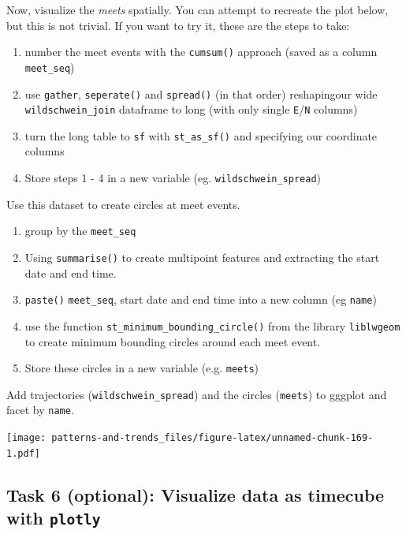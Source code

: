 \documentclass[]{book}
\providecommand{\tightlist}{%
  \setlength{\itemsep}{0pt}\setlength{\parskip}{0pt}}
\begin{document}
Now, visualize the \emph{meets} spatially. You can attempt to recreate
the plot below, but this is not trivial. If you want to try it, these
are the steps to take:

\begin{enumerate}
\def\labelenumi{\arabic{enumi}.}
\tightlist
\item
  number the meet events with the \texttt{cumsum()} approach (saved as a
  column \texttt{meet\_seq})
\item
  use \texttt{gather}, \texttt{seperate()} and \texttt{spread()} (in
  that order) reshapingour wide \texttt{wildschwein\_join} dataframe to
  long (with only single \texttt{E}/\texttt{N} columns)
\item
  turn the long table to \texttt{sf} with \texttt{st\_as\_sf()} and
  specifying our coordinate columns
\item
  Store steps 1 - 4 in a new variable (eg. \texttt{wildschwein\_spread})
\end{enumerate}

Use this dataset to create circles at meet events.

\begin{enumerate}
\def\labelenumi{\arabic{enumi}.}
\tightlist
\item
  group by the \texttt{meet\_seq}
\item
  Using \texttt{summarise()} to create multipoint features and
  extracting the start date and end time.
\item
  \texttt{paste()} \texttt{meet\_seq}, start date and end time into a
  new column (eg \texttt{name})
\item
  use the function \texttt{st\_minimum\_bounding\_circle()} from the
  library \texttt{liblwgeom} to create minimum bounding circles around
  each meet event.
\item
  Store these circles in a new variable (e.g. \texttt{meets})
\end{enumerate}

Add trajectories (\texttt{wildschwein\_spread}) and the circles
(\texttt{meets}) to gggplot and facet by \texttt{name}.

\texttt{[image: patterns-and-trends\_files/figure-latex/unnamed-chunk-169-1.pdf]}

\subsection{\texorpdfstring{Task 6 (optional): Visualize data as
timecube with
\texttt{plotly}}{Task 6 (optional): Visualize data as timecube with plotly}}\label{task-6-optional-visualize-data-as-timecube-with-plotly}
\end{document}
